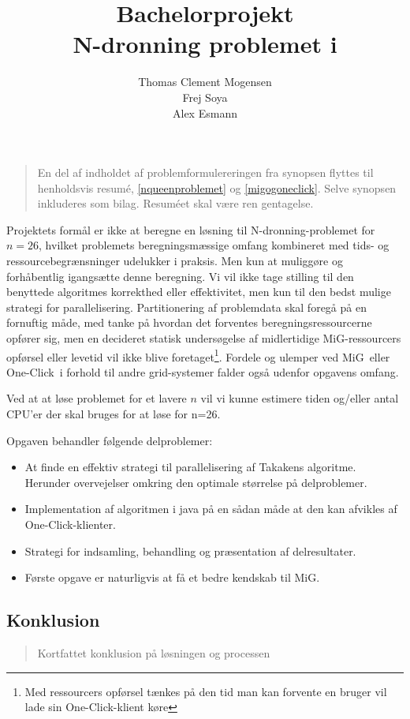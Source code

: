 \documentclass[draft,a4paper,10pt]{article}
\title{Bachelorprojekt\\N-dronning problemet i \mig}
\author{Thomas Clement Mogensen \\ Frej Soya \\ Alex Esmann }
\newcommand{\mig}{MiG}
\newcommand{\oc}{One-Click}
\begin{document}
\maketitle
\tableofcontents

\newpage
\setcounter{page}{1}
\abstract
\begin{verse}
	En del af indholdet af problemformulereringen fra synopsen flyttes til henholdsvis resumé, \ref{nqueenproblemet} og \ref{migogoneclick}. Selve synopsen inkluderes som bilag. Resuméet skal være ren gentagelse.
\end{verse}
Projektets formål er ikke at beregne en løsning til N-dronning-problemet for $n=26$, hvilket problemets beregningsmæssige omfang kombineret med tids- og ressourcebegrænsninger udelukker i praksis. Men kun at muliggøre og forhåbentlig igangsætte denne beregning.
Vi vil ikke tage stilling til den benyttede algoritmes korrekthed eller effektivitet, men kun til den bedst mulige strategi for parallelisering. Partitionering af problemdata skal foregå på en fornuftig måde, med tanke på hvordan det forventes beregningsressourcerne opfører sig, men en decideret statisk undersøgelse af midlertidige \mig-ressourcers opførsel eller levetid vil ikke blive foretaget\footnote{Med ressourcers opførsel tænkes på den tid man kan forvente en bruger vil lade sin \oc-klient køre}. Fordele og ulemper ved \mig\ eller \oc\ i forhold til andre grid-systemer falder også udenfor opgavens omfang.

Ved at at løse problemet for et lavere $n$ vil vi kunne estimere tiden og/eller antal CPU'er der skal bruges for at løse for n=26.

 Opgaven behandler følgende delproblemer:
\begin{itemize}
\item At finde en effektiv strategi til parallelisering af Takakens algoritme. Herunder overvejelser omkring den optimale størrelse på delproblemer.
\item Implementation af algoritmen i java på en sådan måde at den kan afvikles af \oc-klienter.
\item Strategi for indsamling, behandling og præsentation af delresultater.
\item Første opgave er naturligvis at få et bedre kendskab til \mig.
\end{itemize}


\subsection*{Konklusion}\label{konklusion}
\begin{verse}
	Kortfattet konklusion på løsningen og processen
\end{verse}
\end{document}

